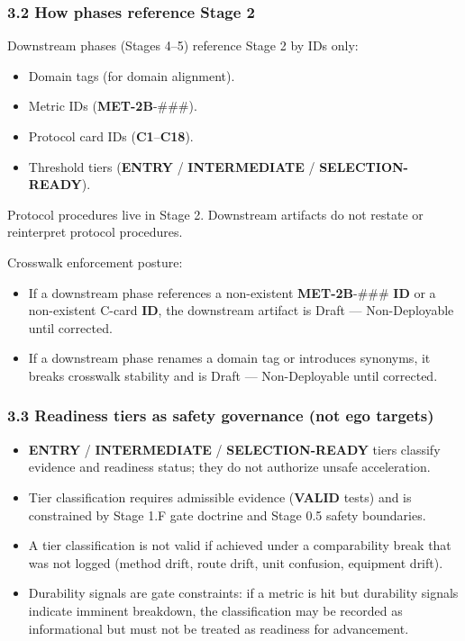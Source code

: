 \documentclass[10pt]{article}
\begin{document}
\subsubsection*{3.2 How phases reference Stage 2}

Downstream phases (Stages 4–5) reference Stage 2 by IDs only:

\begin{itemize}
\item Domain tags (for domain alignment).
\item Metric IDs (\textbf{MET-2B}-\#\#\#).
\item Protocol card IDs (\textbf{C1}–\textbf{C18}).
\item Threshold tiers (\textbf{ENTRY} / \textbf{INTERMEDIATE} / \textbf{SELECTION-READY}).
\end{itemize}

Protocol procedures live in Stage 2. Downstream artifacts do not restate or reinterpret protocol procedures.

Crosswalk enforcement posture:

\begin{itemize}
\item If a downstream phase references a non-existent \textbf{MET-2B}-\#\#\# \textbf{ID} or a non-existent C-card \textbf{ID}, the downstream artifact is Draft — Non-Deployable until corrected.
\item If a downstream phase renames a domain tag or introduces synonyms, it breaks crosswalk stability and is Draft — Non-Deployable until corrected.
\end{itemize}

\subsubsection*{3.3 Readiness tiers as safety governance (not ego targets)}

\begin{itemize}
\item \textbf{ENTRY} / \textbf{INTERMEDIATE} / \textbf{SELECTION-READY} tiers classify evidence and readiness status; they do not authorize unsafe acceleration.
\item Tier classification requires admissible evidence (\textbf{VALID} tests) and is constrained by Stage 1.F gate doctrine and Stage 0.5 safety boundaries.
\item A tier classification is not valid if achieved under a comparability break that was not logged (method drift, route drift, unit confusion, equipment drift).
\item Durability signals are gate constraints: if a metric is hit but durability signals indicate imminent breakdown, the classification may be recorded as informational but must not be treated as readiness for advancement.
\end{itemize}
\end{document}
